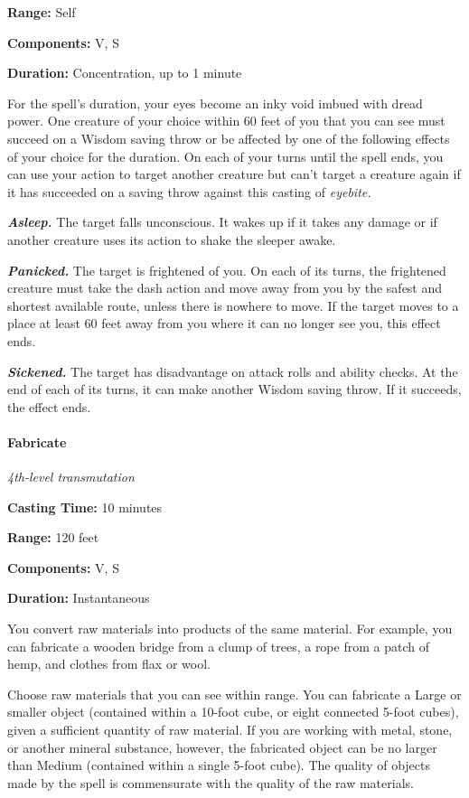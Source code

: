 \documentclass[
]{article}
\begin{document}
\textbf{Range:} Self

\textbf{Components:} V, S

\textbf{Duration:} Concentration, up to 1 minute

For the spell's duration, your eyes become an inky void imbued with
dread power. One creature of your choice within 60 feet of you that you
can see must succeed on a Wisdom saving throw or be affected by one of
the following effects of your choice for the duration. On each of your
turns until the spell ends, you can use your action to target another
creature but can't target a creature again if it has succeeded on a
saving throw against this casting of \emph{eyebite.}

\emph{\textbf{Asleep.}} The target falls unconscious. It wakes up if it
takes any damage or if another creature uses its action to shake the
sleeper awake.

\emph{\textbf{Panicked.}} The target is frightened of you. On each of
its turns, the frightened creature must take the dash action and move
away from you by the safest and shortest available route, unless there
is nowhere to move. If the target moves to a place at least 60 feet away
from you where it can no longer see you, this effect ends.

\emph{\textbf{Sickened.}} The target has disadvantage on attack rolls
and ability checks. At the end of each of its turns, it can make another
Wisdom saving throw. If it succeeds, the effect ends.

\hypertarget{fabricate}{%
\paragraph{Fabricate}\label{fabricate}}

\emph{4th-level transmutation}

\textbf{Casting Time:} 10 minutes

\textbf{Range:} 120 feet

\textbf{Components:} V, S

\textbf{Duration:} Instantaneous

You convert raw materials into products of the same material. For
example, you can fabricate a wooden bridge from a clump of trees, a rope
from a patch of hemp, and clothes from flax or wool.

Choose raw materials that you can see within range. You can fabricate a
Large or smaller object (contained within a 10-foot cube, or eight
connected 5-foot cubes), given a sufficient quantity of raw material. If
you are working with metal, stone, or another mineral substance,
however, the fabricated object can be no larger than Medium (contained
within a single 5-foot cube). The quality of objects made by the spell
is commensurate with the quality of the raw materials.
\end{document}
